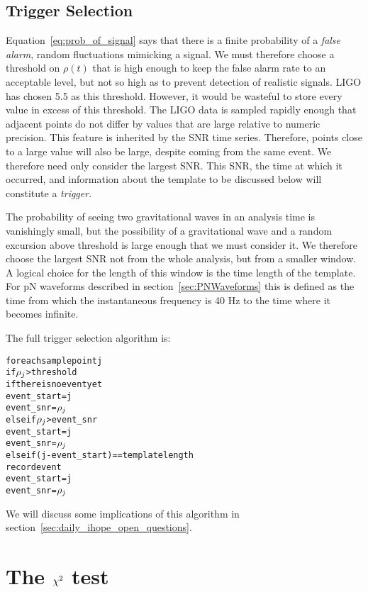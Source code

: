 \subsection{Trigger Selection}
\label{ssec:analysis_trigger_selection}

Equation~\ref{eq:prob_of_signal} says that there is a finite
probability of a \emph{false alarm}, random fluctuations mimicking a
signal.  We must therefore choose a threshold on $\rho(t)$ that is
high enough to keep the false alarm rate to an acceptable level, but
not so high as to prevent detection of realistic signals.  LIGO has
chosen 5.5 as this threshold.  However, it would be wasteful to store
every value in excess of this threshold.  The LIGO data is sampled
rapidly enough that adjacent points do not differ by values that are
large relative to numeric precision.  This feature is inherited by the
SNR time series.  Therefore, points close to a large value will also
be large, despite coming from the same event.  We therefore need only
consider the largest SNR.  This SNR,  the time at which it occurred,
and information about the template to be discussed below will
constitute a \emph{trigger}.

The probability of seeing two gravitational waves in an analysis time
is vanishingly small, but the possibility of a gravitational wave and
a random excursion above threshold is large enough that we must
consider it.  We therefore choose the largest SNR not from the whole
analysis, but from a smaller window.  A logical choice for the length
of this window is the time length of the template.  For pN waveforms
described in section~\ref{sec:PNWaveforms} this is defined as the time
from which the instantaneous frequency is 40 Hz to the time where it
becomes infinite.

The full trigger selection algorithm is:
\newpage

\begin{alltt}
for each sample point j
  if \(\rho\sb{j}\) > threshold
    if there is no event yet
      event\_start = j
      event\_snr   = \(\rho\sb{j}\)
    else if \(\rho\sb{j}\) > event\_snr
      event\_start = j
      event\_snr = \(\rho\sb{j}\)
    else if (j - event\_start) == template length
      record event
      event\_start = j
      event\_snr   = \(\rho\sb{j}\)
\end{alltt}

We will discuss some implications of this algorithm in
section~\ref{sec:daily_ihope_open_questions}.

\section{The $\chi^2$ test}
\label{sec:ihope_chisq}

